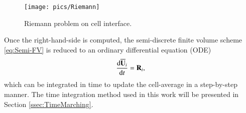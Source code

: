 \begin{figure}[htbp!]
    \centering
    \texttt{[image: pics/Riemann]}
    \caption{Riemann problem on cell interface.}
    \label{fig:Riemann}
\end{figure}


Once the right-hand-side is computed, the semi-discrete finite volume scheme \eqref{eq:Semi-FV} is reduced to an ordinary differential equation (ODE)
\begin{equation}
    \label{eq:FVODECell}
    \derivative{\uu_i}{t} = \R_i,
\end{equation}
which can be integrated in time to update the cell-average in a step-by-step manner. The time integration method used in this work will be presented in Section \ref{ssec:TimeMarching}.

